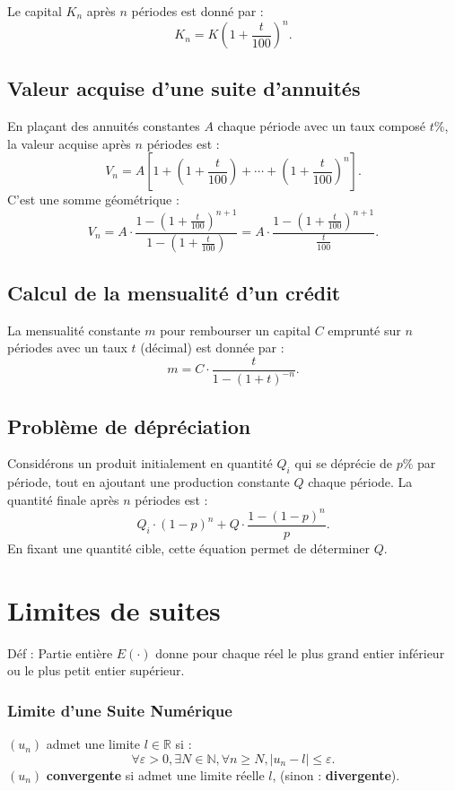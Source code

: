 \documentclass[a4paper,10pt]{article}
\begin{document}
Le capital \(K_n\) après \(n\) périodes est donné par :
\[
K_n = K \left( 1 + \frac{t}{100} \right)^n.
\]

\subsection*{Valeur acquise d'une suite d'annuités}
En plaçant des annuités constantes \(A\) chaque période avec un taux composé \(t\%\), la valeur acquise après \(n\) périodes est :
\[
V_n = A \left[ 1 + \left( 1 + \frac{t}{100} \right) + \cdots + \left( 1 + \frac{t}{100} \right)^n \right].
\]
C'est une somme géométrique :
\[
V_n = A \cdot \frac{1 - \left( 1 + \frac{t}{100} \right)^{n+1}}{1 - \left( 1 + \frac{t}{100} \right)} = A \cdot \frac{1 - \left( 1 + \frac{t}{100} \right)^{n+1}}{\frac{t}{100}}.
\]

\subsection*{Calcul de la mensualité d'un crédit}
La mensualité constante \(m\) pour rembourser un capital \(C\) emprunté sur \(n\) périodes avec un taux \(t\) (décimal) est donnée par :
\[
m = C \cdot \frac{t}{1 - (1 + t)^{-n}}.
\]

\subsection*{Problème de dépréciation}
Considérons un produit initialement en quantité \(Q_i\) qui se déprécie de \(p\%\) par période, tout en ajoutant une production constante \(Q\) chaque période. La quantité finale après \(n\) périodes est :
\[
Q_i \cdot (1 - p)^n + Q \cdot \frac{1 - (1 - p)^n}{p}.
\]
En fixant une quantité cible, cette équation permet de déterminer \(Q\).


\section*{Limites de suites}

Déf : Partie entière $E(\cdot)$ donne pour chaque réel le plus grand entier inférieur ou le plus petit entier supérieur.


\subsubsection*{Limite d'une Suite Numérique}

$(u_n)$ admet une limite $l \in \mathbb{R}$ si :
\[
\forall \varepsilon > 0, \exists N \in \mathbb{N}, \forall n \geq N, |u_n - l| \leq \varepsilon.
\]
$(u_n)$ \textbf{convergente} si admet une limite réelle $l$, (sinon : \textbf{divergente}).
\end{document}
